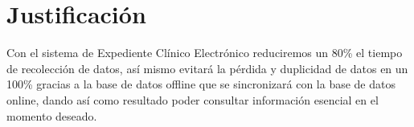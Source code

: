\label{sec:hipotesis}



\section{Justificación}
\label{sec:justificacion}
Con el sistema de Expediente Clínico Electrónico reduciremos un 80\% el tiempo de recolección de datos, así mismo evitará la pérdida y duplicidad de datos en un 100\% gracias a la base de datos offline que se sincronizará con la base de datos online, dando así como resultado poder consultar información esencial en el momento deseado.
